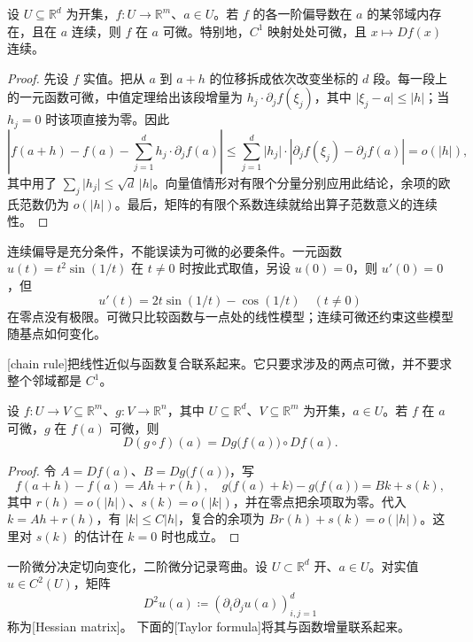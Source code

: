 \begin{proposition}\label{b2:prop:01-c1-criterion}
设 \(U\subseteq\mathbb R^d\) 为开集，\(f:U\to\mathbb R^m\)、\(a\in U\)。若 \(f\) 的各一阶偏导数在 \(a\) 的某邻域内存在，且在 \(a\) 连续，则 \(f\) 在 \(a\) 可微。特别地，\(C^1\) 映射处处可微，且 \(x\mapsto Df(x)\) 连续。
\end{proposition}
\begin{proof}
先设 \(f\) 实值。把从 \(a\) 到 \(a+h\) 的位移拆成依次改变坐标的 \(d\) 段。每一段上的一元函数可微，中值定理给出该段增量为 \(h_j\cdot\partial_jf(\xi_j)\)，其中 \(\lvert\xi_j-a\rvert\leq\lvert h\rvert\)；当 \(h_j=0\) 时该项直接为零。因此
\[
 \left|f(a+h)-f(a)-\sum_{j=1}^d h_j\cdot\partial_jf(a)\right|
 \leq\sum_{j=1}^d\lvert h_j\rvert\cdot
 \left|\partial_jf(\xi_j)-\partial_jf(a)\right|
 =o(\lvert h\rvert),
\]
其中用了 \(\sum_j\lvert h_j\rvert\leq\sqrt d\,\lvert h\rvert\)。向量值情形对有限个分量分别应用此结论，余项的欧氏范数仍为 \(o(\lvert h\rvert)\)。最后，矩阵的有限个系数连续就给出算子范数意义的连续性。
\end{proof}

连续偏导是充分条件，不能误读为可微的必要条件。一元函数 \(u(t)=t^2\sin(1/t)\) 在 \(t\ne0\) 时按此式取值，另设 \(u(0)=0\)，则 \(u'(0)=0\)，但
\[
 u'(t)=2t\sin(1/t)-\cos(1/t)\quad(t\ne0)
\]
在零点没有极限。可微只比较函数与一点处的线性模型；连续可微还约束这些模型随基点如何变化。

\ProseParagraphBreak

[chain rule]把线性近似与函数复合联系起来。它只要求涉及的两点可微，并不要求整个邻域都是 \(C^1\)。

\begin{proposition}[链式法则]\label{b2:prop:01-chain-rule}
设 \(f:U\rightarrow V\subseteq\mathbb R^m\)、\(g:V\rightarrow\mathbb R^n\)，其中 \(U\subseteq\mathbb R^d\)、\(V\subseteq\mathbb R^m\) 为开集，\(a\in U\)。若 \(f\) 在 \(a\) 可微，\(g\) 在 \(f(a)\) 可微，则
\[
 D(g\circ f)(a)=Dg\bigl(f(a)\bigr)\circ Df(a).
\]
\end{proposition}
\begin{proof}
令 \(A=Df(a)\)、\(B=Dg\bigl(f(a)\bigr)\)，写
\[
 f(a+h)-f(a)=Ah+r(h),\quad
 g\bigl(f(a)+k\bigr)-g\bigl(f(a)\bigr)=Bk+s(k),
\]
其中 \(r(h)=o(\lvert h\rvert)\)、\(s(k)=o(\lvert k\rvert)\)，并在零点把余项取为零。代入 \(k=Ah+r(h)\)，有 \(\lvert k\rvert\leq C\lvert h\rvert\)，复合的余项为 \(Br(h)+s(k)=o(\lvert h\rvert)\)。这里对 \(s(k)\) 的估计在 \(k=0\) 时也成立。
\end{proof}

一阶微分决定切向变化，二阶微分记录弯曲。设 \(U\subset\mathbb R^d\) 开、\(a\in U\)。对实值 \(u\in C^2(U)\)，矩阵
\[
 D^2u(a)\coloneqq\left(\partial_i\partial_ju(a)\right)_{i,j=1}^d
\]
称为[Hessian matrix]。
下面的[Taylor formula]将其与函数增量联系起来。

